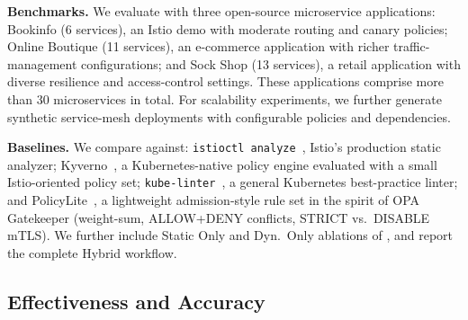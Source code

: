 
\textbf{Benchmarks.}
We evaluate \name with three open-source microservice applications: Bookinfo (6 services), an Istio demo with moderate routing and canary policies; Online Boutique (11 services), an e-commerce application with richer traffic-management configurations; and Sock Shop (13 services), a retail application with diverse resilience and access-control settings. These applications comprise more than 30 microservices in total. For scalability experiments, we further generate synthetic service-mesh deployments with configurable policies and dependencies.

\textbf{Baselines.}
We compare \name against:
\texttt{istioctl analyze}~\cite{istioctl-analyze}, Istio's production static analyzer;
Kyverno~\cite{kyverno}, a Kubernetes-native policy engine evaluated with a small Istio-oriented policy set;
\texttt{kube-linter}~\cite{kubelinter}, a general Kubernetes best-practice linter;
and PolicyLite~\cite{gatekeeper}, a lightweight admission-style rule set in the spirit of OPA Gatekeeper (weight-sum, ALLOW+DENY conflicts, STRICT vs.\ DISABLE mTLS).
We further include Static Only and Dyn.\ Only ablations of \name, and report the complete Hybrid workflow.

\subsection{Effectiveness and Accuracy}
\label{sec_eval_eff}

